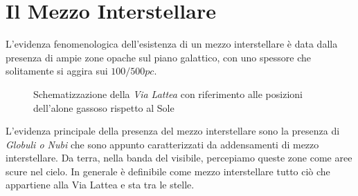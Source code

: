 \section{Il Mezzo Interstellare}
L'evidenza fenomenologica dell'esistenza di un mezzo interstellare \`e data dalla presenza di ampie zone  opache sul piano galattico, con uno spessore che solitamente si aggira sui $100/500 pc$.
\begin{figure}
		\centering
		\caption{Schematizzazione della \emph{Via Lattea} con riferimento alle posizioni dell'alone gassoso rispetto al Sole}
\end{figure}
L'evidenza principale della presenza del mezzo interstellare sono la presenza di \emph{Globuli o Nubi} che sono appunto caratterizzati da addensamenti di mezzo interstellare. Da terra, nella banda del visibile, percepiamo queste zone come aree scure nel cielo. In generale \`e definibile come mezzo interstellare tutto ci\`o che appartiene alla Via Lattea e sta tra le stelle.

